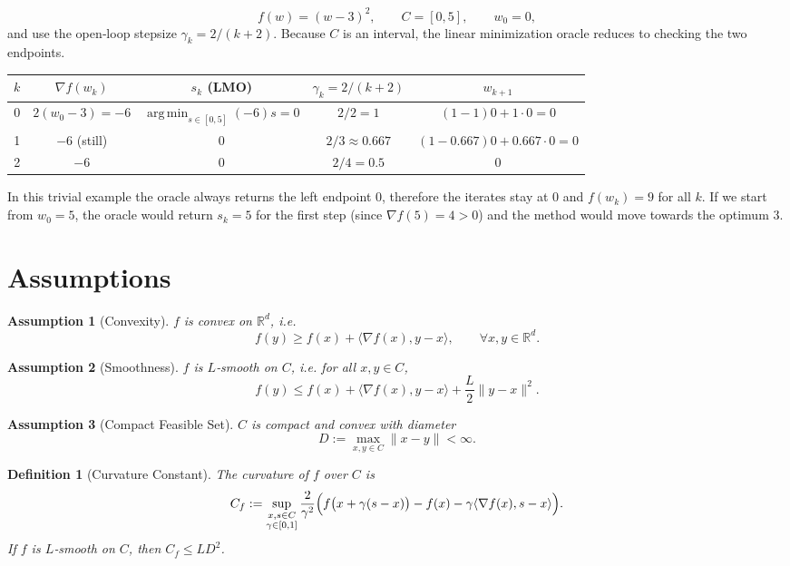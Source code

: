 \documentclass{article}
\newtheorem{assumption}{Assumption}
\newtheorem{definition}{Definition}
\newcommand{\R}{\mathbb{R}}
\newcommand{\inner}[2]{\langle #1,#2\rangle}
\newcommand{\argmin}{\operatorname*{arg\,min}}
\begin{document}
\[
f(w)=(w-3)^{2},\qquad C=[0,5],\qquad w_{0}=0,
\]
and use the open‑loop stepsize $\gamma_{k}=2/(k+2)$.  
Because $C$ is an interval, the linear minimization oracle reduces to checking the two endpoints.

\begin{center}
\begin{tabular}{c|c|c|c|c}
$k$ & $\nabla f(w_{k})$ & $s_{k}$ (LMO) & $\gamma_{k}=2/(k+2)$ & $w_{k+1}$ \\ \hline
0 & $2(w_{0}-3)=-6$ & $\argmin_{s\in[0,5]}(-6)s =0$ & $2/2=1$ & $(1-1)0+1\cdot0=0$ \\
1 & $-6$ (still) & $0$ & $2/3\approx0.667$ & $(1-0.667)0+0.667\cdot0=0$ \\
2 & $-6$ & $0$ & $2/4=0.5$ & $0$ 
\end{tabular}
\end{center}

In this trivial example the oracle always returns the left endpoint $0$, therefore the iterates stay at $0$ and $f(w_{k})=9$ for all $k$.  
If we start from $w_{0}=5$, the oracle would return $s_{k}=5$ for the first step (since $\nabla f(5)=4>0$) and the method would move towards the optimum $3$.

\newpage
\section*{Assumptions}
\begin{assumption}[Convexity]\label{ass:convex}
$f$ is convex on $\R^{d}$, i.e.
\[
f(y)\ge f(x)+\inner{\nabla f(x)}{y-x},\qquad\forall x,y\in\R^{d}.
\]
\end{assumption}
\begin{assumption}[Smoothness]\label{ass:smooth}
$f$ is $L$‑smooth on $C$, i.e. for all $x,y\in C$,
\[
f(y)\le f(x)+\inner{\nabla f(x)}{y-x}+\frac{L}{2}\|y-x\|^{2}.
\]
\end{assumption}
\begin{assumption}[Compact Feasible Set]\label{ass:compact}
$C$ is compact and convex with diameter
\[
D:=\max_{x,y\in C}\|x-y\|<\infty .
\]
\end{assumption}
\begin{definition}[Curvature Constant]\label{def:curv}
The curvature of $f$ over $C$ is
\[
C_{f}:=\sup_{\substack{x,s\in C\\ \gamma\in[0,1]}}
\frac{2}{\gamma^{2}}\Bigl(f\bigl(x+\gamma(s-x)\bigr)-f(x)-\gamma\inner{\nabla f(x)}{s-x}\Bigr).
\]
If $f$ is $L$‑smooth on $C$, then $C_{f}\le L D^{2}$.
\end{definition}
\end{document}
